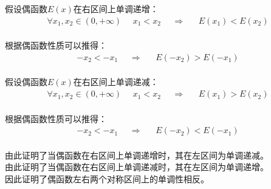\documentclass[UTF8]{ctexart}
\begin{document}
    假设偶函数$E(x)$在右区间上单调递增：
    \begin{align}
        \forall x_1,x_2\in (0,+\infty)~~~~~~x_1<x_2~~~~~~\Longrightarrow~~~~~~~E(x_1)<E(x_2)
    \end{align}\\
    根据偶函数性质可以推得：
    \begin{align}
        -x_2<-x_1~~~~~~\Longrightarrow~~~~~~~E(-x_2)>E(-x_1)
    \end{align}\\
    假设偶函数$E(x)$在右区间上单调递减：
    \begin{align}
        \forall x_1,x_2\in (0,+\infty)~~~~~~x_1<x_2~~~~~~\Longrightarrow~~~~~~~E(x_1)>E(x_2)
    \end{align}\\
    根据偶函数性质可以推得：
    \begin{align}
        -x_2<-x_1~~~~~~\Longrightarrow~~~~~~~E(-x_2)<E(-x_1)
    \end{align}\\
    由此证明了当偶函数在右区间上单调递增时，其在左区间为单调递减。\\[3mm]
    由此证明了当偶函数在右区间上单调递减时，其在左区间为单调递增。\\[3mm]
    因此证明了偶函数左右两个对称区间上的单调性相反。

\newpage
\end{document}
